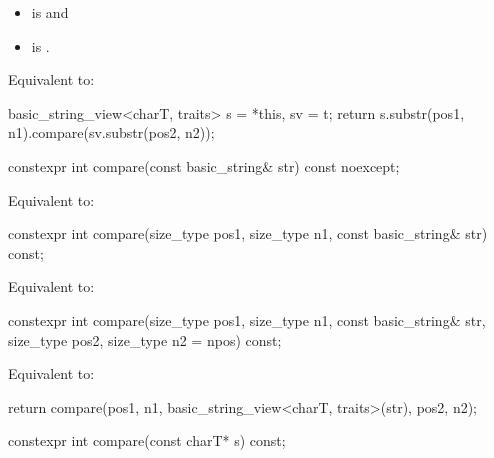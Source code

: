\begin{itemdescr}
\pnum
\constraints
\begin{itemize}
\item
{} is
 and
\item
{} is
.
\end{itemize}

\pnum
\effects
Equivalent to:
\begin{codeblock}
basic_string_view<charT, traits> s = *this, sv = t;
return s.substr(pos1, n1).compare(sv.substr(pos2, n2));
\end{codeblock}
\end{itemdescr}

%
\begin{itemdecl}
constexpr int compare(const basic_string& str) const noexcept;
\end{itemdecl}

\begin{itemdescr}
\pnum
\effects
Equivalent to:
\end{itemdescr}

%
\begin{itemdecl}
constexpr int compare(size_type pos1, size_type n1, const basic_string& str) const;
\end{itemdecl}

\begin{itemdescr}
\pnum
\effects
Equivalent to:
\end{itemdescr}

%
\begin{itemdecl}
constexpr int compare(size_type pos1, size_type n1, const basic_string& str,
                      size_type pos2, size_type n2 = npos) const;
\end{itemdecl}

\begin{itemdescr}
\pnum
\effects
Equivalent to:
\begin{codeblock}
return compare(pos1, n1, basic_string_view<charT, traits>(str), pos2, n2);
\end{codeblock}
\end{itemdescr}

%
\begin{itemdecl}
constexpr int compare(const charT* s) const;
\end{itemdecl}

